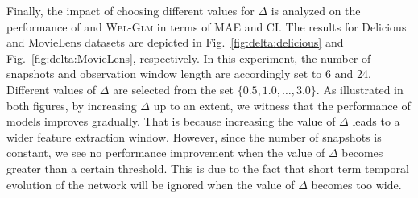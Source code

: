 Finally, the impact of choosing different values for $\Delta$ is analyzed on the performance of \npglm and \textsc{Wbl-Glm} in terms of MAE and CI. The results for Delicious and MovieLens datasets are depicted in Fig.~\ref{fig:delta:delicious} and Fig.~\ref{fig:delta:MovieLens}, respectively. In this experiment, the number of snapshots and observation window length are accordingly set to 6 and 24. Different values of $\Delta$ are selected from the set $\{0.5,1.0,\dots,3.0\}$. As illustrated in both figures, by increasing  $\Delta$ up to an extent, we witness that the performance of models improves gradually. That is because increasing the value of $\Delta$ leads to a wider feature extraction window. However, since the number of snapshots is constant, we see no performance improvement when the value of $\Delta$ becomes greater than a certain threshold. This is due to the fact that short term temporal evolution of the network will be ignored when the value of $\Delta$ becomes too wide.
 



